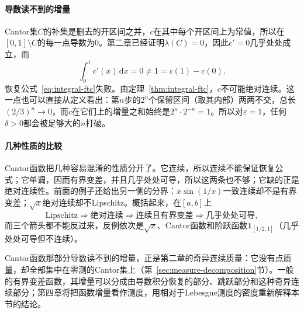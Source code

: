 \paragraph{导数读不到的增量}
Cantor集$C$的补集是删去的开区间之并，$c$在其中每个开区间上为常值，所以在$[0,1]\setminus C$的每一点导数为$0$。第二章已经证明$\lambda(C)=0$，因此$c'=0$几乎处处成立，而
\[
 \int_0^1c'(x)\,\mathrm dx=0\ne1=c(1)-c(0).
\]
恢复公式~\eqref{eq:integral-ftc}失败。由定理~\ref{thm:integral-ftc}，$c$不可能绝对连续。这一点也可以直接从定义看出：第$n$步的$2^n$个保留区间（取其内部）两两不交，总长$(2/3)^n\to0$，而$c$在它们上的增量之和始终是$2^n\cdot2^{-n}=1$。所以对$\varepsilon=1$，任何$\delta>0$都会被足够大的$n$打破。

\paragraph{几种性质的比较}
Cantor函数把几种容易混淆的性质分开了。它连续，所以连续不能保证恢复公式；它单调，因而有界变差，并且几乎处处可导，所以这两条也不够；它缺的正是绝对连续性。前面的例子还给出另一侧的分界：$x\sin(1/x)$一致连续却不是有界变差；$\sqrt x$绝对连续却不Lipschitz。概括起来，在$[a,b]$上
\[
 \text{Lipschitz}\Longrightarrow\text{绝对连续}\Longrightarrow\text{连续且有界变差}\Longrightarrow\text{几乎处处可导},
\]
而三个箭头都不能反过来，反例依次是$\sqrt x$、Cantor函数和阶跃函数$\mathbf 1_{[1/2,1]}$（几乎处处可导但不连续）。

Cantor函数那部分导数读不到的增量，正是第二章的奇异连续质量：它没有点质量，却全部集中在零测的Cantor集上（第~\ref{sec:measure-decomposition}节）。一般的有界变差函数，其增量可以分成由导数积分恢复的部分、跳跃部分和这种奇异连续部分；第四章将把函数增量看作测度，用相对于Lebesgue测度的密度重新解释本节的结论。
